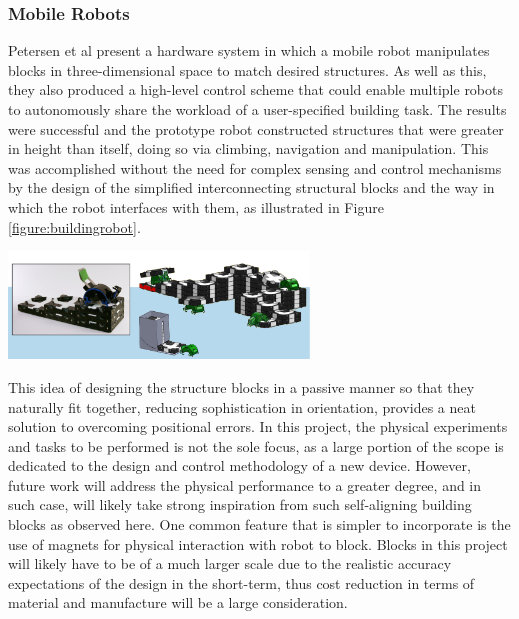 \documentclass[11pt]{article}
\begin{document}
\subsubsection{Mobile Robots} \label{mobilerobots}
Petersen et al \cite{Petersen2011} present a hardware system in which a mobile robot manipulates blocks in three-dimensional space to match desired structures. As well as this, they also produced a high-level control scheme that could enable multiple robots to autonomously share the workload of a user-specified building task. The results were successful and the prototype robot constructed structures that were greater in height than itself, doing so via climbing, navigation and manipulation. This was accomplished without the need for complex sensing and control mechanisms by the design of the simplified interconnecting structural blocks and the way in which the robot interfaces with them, as illustrated in Figure \ref{figure:buildingrobot}.

\begin{center}
\includegraphics[width = 0.6\textwidth]{buildingrobot.png}
\label{figure:buildingrobot}
\end{center}

This idea of designing the structure blocks in a passive manner so that they naturally fit together, reducing sophistication in orientation, provides a neat solution to overcoming positional errors. In this project, the physical experiments and tasks to be performed is not the sole focus, as a large portion of the scope is dedicated to the design and control methodology of a new device. However, future work will address the physical performance to a greater degree, and in such case, will likely take strong inspiration from such self-aligning building blocks as observed here. One common feature that is simpler to incorporate is the use of magnets for physical interaction with robot to block. Blocks in this project will likely have to be of a much larger scale due to the realistic accuracy expectations of the design in the short-term, thus cost reduction in terms of material and manufacture will be a large consideration.
\end{document}
